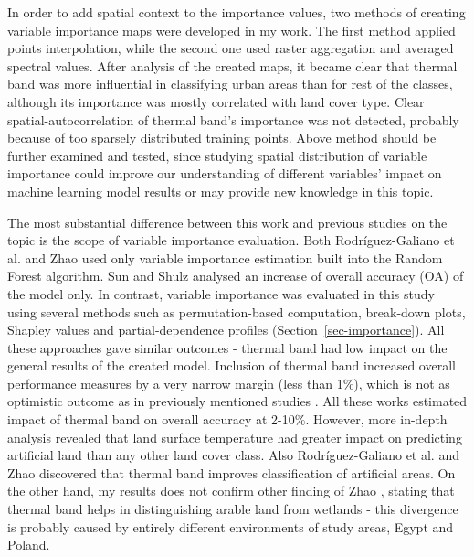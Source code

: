 \documentclass{amuthesis}
\begin{document}
In order to add spatial context to the importance values, two methods of
creating variable importance maps were developed in my work. The first
method applied points interpolation, while the second one used raster
aggregation and averaged spectral values. After analysis of the created
maps, it became clear that thermal band was more influential in
classifying urban areas than for rest of the classes, although its
importance was mostly correlated with land cover type. Clear
spatial-autocorrelation of thermal band's importance was not detected,
probably because of too sparsely distributed training points. Above
method should be further examined and tested, since studying spatial
distribution of variable importance could improve our understanding of
different variables' impact on machine learning model results or may
provide new knowledge in this topic.

The most substantial difference between this work and previous studies
on the topic is the scope of variable importance evaluation. Both
Rodríguez-Galiano et al.
\autocite*{rodriguez-galiano_incorporating_2012} and Zhao
\autocite*{zhao_exploring_2019} used only variable importance estimation
built into the Random Forest algorithm. Sun and Shulz
\autocite*{sun_improvement_2015} analysed an increase of overall
accuracy (OA) of the model only. In contrast, variable importance was
evaluated in this study using several methods such as permutation-based
computation, break-down plots, Shapley values and partial-dependence
profiles (Section~\ref{sec-importance}). All these approaches gave
similar outcomes - thermal band had low impact on the general results of
the created model. Inclusion of thermal band increased overall
performance measures by a very narrow margin (less than 1\%), which is
not as optimistic outcome as in previously mentioned studies
\autocite{rodriguez-galiano_incorporating_2012,sun_improvement_2015,zhao_exploring_2019}.
All these works estimated impact of thermal band on overall accuracy at
2-10\%. However, more in-depth analysis revealed that land surface
temperature had greater impact on predicting artificial land than any
other land cover class. Also Rodríguez-Galiano et al.
\autocite*{rodriguez-galiano_incorporating_2012} and Zhao
\autocite*{zhao_exploring_2019} discovered that thermal band improves
classification of artificial areas. On the other hand, my results does
not confirm other finding of Zhao \autocite*{zhao_exploring_2019},
stating that thermal band helps in distinguishing arable land from
wetlands - this divergence is probably caused by entirely different
environments of study areas, Egypt and Poland.
\end{document}
